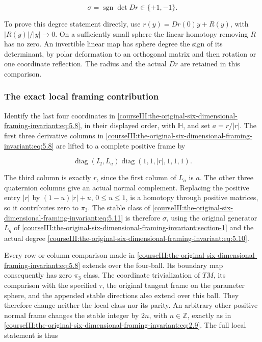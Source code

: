 \begin{equation}
\sigma=\operatorname{sgn}\det Dr\in\{+1,-1\}.
 \label{courseIII:the-original-six-dimensional-framing-invariant:eq:5.10}
\end{equation}

To prove this degree statement directly, use \(r(y)=Dr(0)y+R(y)\), with \(|R(y)|/|y|\to0\). On a sufficiently small sphere the linear homotopy removing \(R\) has no zero. An invertible linear map has sphere degree the sign of its determinant, by polar deformation to an orthogonal matrix and then rotation or one coordinate reflection. The radius and the actual \(Dr\) are retained in this comparison.

\subsubsection{The exact local framing contribution}
\label{courseIII:the-original-six-dimensional-framing-invariant:section-5.3}

Identify the last four coordinates in \eqref{courseIII:the-original-six-dimensional-framing-invariant:eq:5.8}, in their displayed order, with \(\mathbb H\), and set \(a=r/|r|\). The first three derivative columns in \eqref{courseIII:the-original-six-dimensional-framing-invariant:eq:5.8} are lifted to a complete positive frame by

\begin{equation}
\operatorname{diag}(I_2,L_a)
              \operatorname{diag}(1,1,|r|,1,1,1).
 \label{courseIII:the-original-six-dimensional-framing-invariant:eq:5.11}
\end{equation}

The third column is exactly \(r\), since the first column of \(L_a\) is \(a\). The other three quaternion columns give an actual normal complement. Replacing the positive entry \(|r|\) by \((1-u)|r|+u\), \(0\le u\le1\), is a homotopy through positive matrices, so it contributes zero to \(\pi_3\). The stable class of \eqref{courseIII:the-original-six-dimensional-framing-invariant:eq:5.11} is therefore \(\sigma\), using the original generator \(L_q\) of \cref{courseIII:the-original-six-dimensional-framing-invariant:section-1} and the actual degree \eqref{courseIII:the-original-six-dimensional-framing-invariant:eq:5.10}.

Every row or column comparison made in \eqref{courseIII:the-original-six-dimensional-framing-invariant:eq:5.8} extends over the four-ball. Its boundary map consequently has zero \(\pi_3\) class. The coordinate trivialization of \(TM\), its comparison with the specified \(\tau\), the original tangent frame on the parameter sphere, and the appended stable directions also extend over this ball. They therefore change neither the local class nor its parity. An arbitrary other positive normal frame changes the stable integer by \(2n\), with \(n\in\mathbb Z\), exactly as in \eqref{courseIII:the-original-six-dimensional-framing-invariant:eq:2.9}. The full local statement is thus

